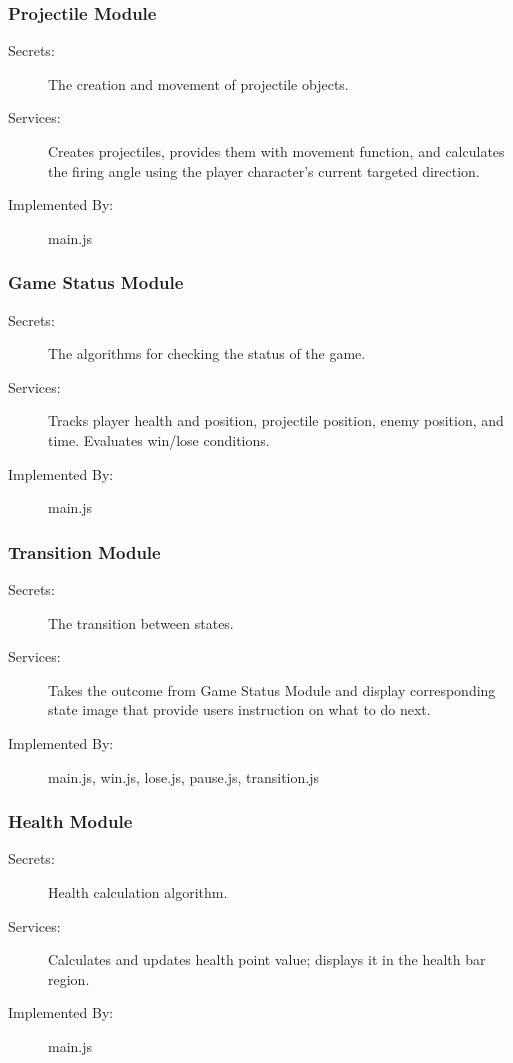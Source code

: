 \documentclass[12pt, titlepage]{article}
\begin{document}
\subsubsection{Projectile Module}

\begin{description}
\item[Secrets:]The creation and movement of projectile objects.
\item[Services:]Creates projectiles, provides them with movement function, and calculates the firing angle using the player character's current targeted direction.
\item[Implemented By:] main.js
\end{description}

\subsubsection{Game Status Module}

\begin{description}
\item[Secrets:]The algorithms for checking the status of the game.
\item[Services:]Tracks player health and position, projectile position, enemy position, and time. Evaluates win/lose conditions. 
\item[Implemented By:] main.js
\end{description}


\subsubsection{Transition Module}

\begin{description}
\item[Secrets:]The transition between states.
\item[Services:]Takes the outcome from Game Status Module and display corresponding state image that provide users instruction on what to do next.
\item[Implemented By:] main.js, win.js, lose.js, pause.js, transition.js
\end{description}

\subsubsection{Health Module}

\begin{description}
\item[Secrets:]Health calculation algorithm. 
\item[Services:]Calculates and updates health point value; displays it in the health bar region.
\item[Implemented By:] main.js
\end{description}
\end{document}
